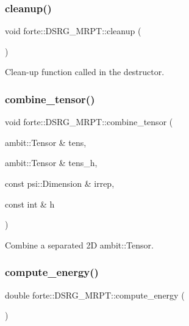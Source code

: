 \subsubsection{\texorpdfstring{cleanup()}{cleanup()}}
{\footnotesize\ttfamily void forte\+::\+D\+S\+R\+G\+\_\+\+M\+R\+P\+T\+::cleanup (\begin{DoxyParamCaption}{ }\end{DoxyParamCaption})\hspace{0.3cm}{\ttfamily [protected]}}



Clean-\/up function called in the destructor. 

\mbox{\label{classforte_1_1_d_s_r_g___m_r_p_t_acdd93b6514696a2b08b25f4825a24a30}} 
\subsubsection{\texorpdfstring{combine\+\_\+tensor()}{combine\_tensor()}}
{\footnotesize\ttfamily void forte\+::\+D\+S\+R\+G\+\_\+\+M\+R\+P\+T\+::combine\+\_\+tensor (\begin{DoxyParamCaption}\item[{ambit\+::\+Tensor \&}]{tens,  }\item[{ambit\+::\+Tensor \&}]{tens\+\_\+h,  }\item[{const psi\+::\+Dimension \&}]{irrep,  }\item[{const int \&}]{h }\end{DoxyParamCaption})\hspace{0.3cm}{\ttfamily [protected]}}



Combine a separated 2D ambit\+::\+Tensor. 

\mbox{\label{classforte_1_1_d_s_r_g___m_r_p_t_a83b7f20d255a4f1f33bb05d707846f85}} 
\subsubsection{\texorpdfstring{compute\+\_\+energy()}{compute\_energy()}}
{\footnotesize\ttfamily double forte\+::\+D\+S\+R\+G\+\_\+\+M\+R\+P\+T\+::compute\+\_\+energy (\begin{DoxyParamCaption}{ }\end{DoxyParamCaption})\hspace{0.3cm}{\ttfamily [virtual]}}



